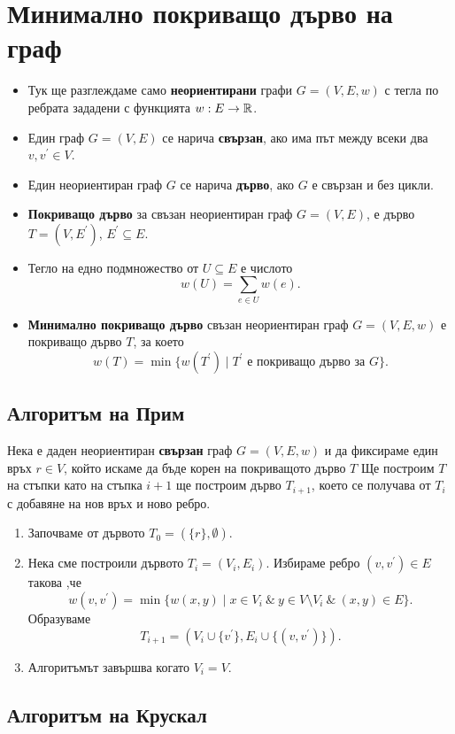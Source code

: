 \section{Минимално покриващо дърво на граф}


\begin{itemize}
\item
  Тук ще разглеждаме само {\bf неориентирани} графи $G = (V,E,w)$ с тегла по ребрата
  зададени с функцията $w:E\to\mathbb{R}$.
\item
  Един граф $G = (V,E)$ се нарича {\bf свързан}, ако има път между всеки два $v,v^\prime \in V$.
\item 
  Един неориентиран граф $G$ се нарича {\bf дърво}, ако $G$ е свързан и без цикли.
\item
  {\bf Покриващо дърво} за свъзан неориентиран граф $G = (V,E)$,
  е дърво $T = (V,E^\prime)$, $E^\prime \subseteq E$.
\item
  Тегло на едно подмножество от $U \subseteq E$ е числото
  \[w(U) = \sum_{e \in U} w(e).\]
\item
  {\bf Минимално покриващо дърво} свъзан неориентиран граф $G = (V,E,w)$
  е покриващо дърво $T$, за което 
  \[w(T) = \min\{w(T^\prime) \mid T^\prime\mbox{ е покриващо дърво за }G\}.\]
\end{itemize}

\subsection{Алгоритъм на Прим}

Нека е даден неориентиран {\bf свързан} граф $G = (V,E,w)$ и да фиксираме един връх $r \in V$, който искаме да бъде корен на покриващото дърво $T$
Ще построим $T$ на стъпки като на стъпка $i+1$ ще построим дърво $T_{i+1}$, което се получава от $T_i$
с добавяне на нов връх и ново ребро.

\begin{enumerate}
\item 
  Започваме от дървото $T_0 = (\{r\},\emptyset)$.
\item
  Нека сме построили дървото $T_i = (V_i,E_i)$.
  Избираме ребро $(v,v^\prime) \in E$ такова ,че
  \[w(v,v^\prime) = \min\{w(x,y) \mid x\in V_i\ \&\ y \in V\setminus V_i\ \&\ (x,y) \in E\}.\]
  Образуваме \[T_{i+1} = (V_i\cup\{v^\prime\}, E_i \cup \{(v,v^\prime)\}).\]
\item
  Алгоритъмът завършва когато $V_i = V$.
\end{enumerate}

\subsection{Алгоритъм на Крускал}

